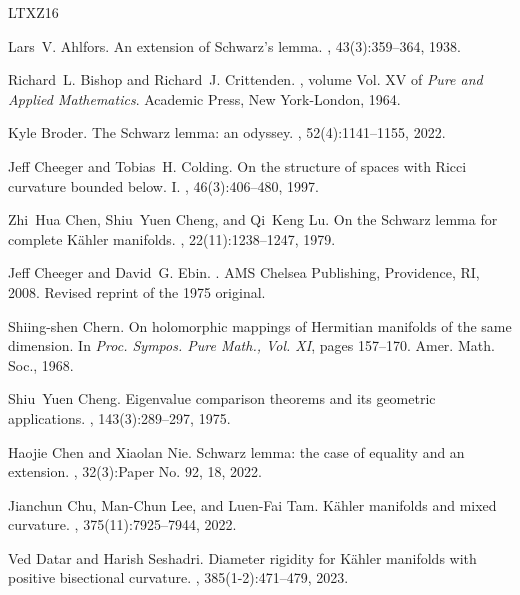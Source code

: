 \documentclass[12pt]{amsart}
\theoremstyle{plain}
\theoremstyle{definition}
\renewcommand{\>}{\rightarrow}
\numberwithin{equation}{section} %
\begin{document}
\baselineskip
%
%



\begin{thebibliography}{LTXZ16}
	
	Lars~V. Ahlfors.
	\newblock An extension of {S}chwarz's lemma.
	, 43(3):359--364, 1938.
	
	
	Richard~L. Bishop and Richard~J. Crittenden.
	, volume Vol. XV of {\em Pure and Applied Mathematics}.
	\newblock Academic Press, New York-London, 1964.
	
	Kyle Broder.
	\newblock The Schwarz lemma: an odyssey.
	, 52(4):1141--1155, 2022.
	
	
	Jeff Cheeger and Tobias~H. Colding.
	\newblock On the structure of spaces with {R}icci curvature bounded below. {I}.
	, 46(3):406--480, 1997.
	
	Zhi~Hua Chen, Shiu~Yuen Cheng, and Qi~Keng Lu.
	\newblock On the {S}chwarz lemma for complete {K}\"ahler manifolds.
	, 22(11):1238--1247, 1979.
	
	Jeff Cheeger and David~G. Ebin.
	.
	\newblock AMS Chelsea Publishing, Providence, RI, 2008.
	\newblock Revised reprint of the 1975 original.
	
	
	Shiing-shen Chern.
	\newblock On holomorphic mappings of Hermitian manifolds of the same dimension.
	\newblock In {\em Proc. Sympos. Pure Math., Vol. XI}, pages 157--170. Amer. Math. Soc., 1968.
	
	Shiu~Yuen Cheng.
	\newblock Eigenvalue comparison theorems and its geometric applications.
	, 143(3):289--297, 1975.
	
	Haojie Chen and Xiaolan Nie.
	\newblock Schwarz lemma: the case of equality and an extension.
	, 32(3):Paper No. 92, 18, 2022.
	
	
	Jianchun Chu, Man-Chun Lee, and Luen-Fai Tam.
	\newblock K\"ahler manifolds and mixed curvature.
	, 375(11):7925--7944, 2022.
	
	
	Ved Datar and Harish Seshadri.
	\newblock Diameter rigidity for {K}\"ahler manifolds with positive bisectional curvature.
	, 385(1-2):471--479, 2023.
	

\end{thebibliography}
\end{document}
